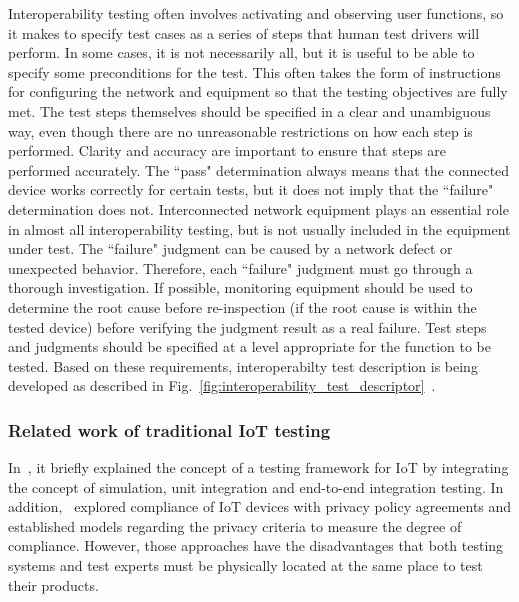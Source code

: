 Interoperability testing often involves activating and observing user functions, so it makes to specify test cases as a series of steps that human test drivers will perform. In some cases, it is not necessarily all, but it is useful to be able to specify some preconditions for the test. This often takes the form of instructions for configuring the network and equipment so that the testing objectives are fully met. The test steps themselves should be specified in a clear and unambiguous way, even though there are no unreasonable restrictions on how each step is performed. Clarity and accuracy are important to ensure that steps are performed accurately. The ``pass" determination always means that the connected device works correctly for certain tests, but it does not imply that the ``failure" determination does not. Interconnected network equipment plays an essential role in almost all interoperability testing, but is not usually included in the equipment under test. The ``failure" judgment can be caused by a network defect or unexpected behavior. Therefore, each ``failure" judgment must go through a thorough investigation. If possible, monitoring equipment should be used to determine the root cause before re-inspection (if the root cause is within the tested device) before verifying the judgment result as a real failure. Test steps and judgments should be specified at a level appropriate for the function to be tested. Based on these requirements, interoperabilty test description is being developed as described in Fig.~\ref{fig:interoperability_test_descriptor}~\cite{2018_ts_0013_interoperability}. 

\subsubsection{Related work of traditional IoT testing}
\label{sec:related_work}
\noindent
In~\cite{frameworkIoT2017}, it briefly explained the concept of a
testing framework for IoT by integrating the concept of simulation,
unit integration and end-to-end integration testing.
In addition,~\cite{ensuringCompliance2018} explored compliance
of IoT devices with privacy policy agreements and established models
regarding the privacy criteria to measure the degree of
compliance. However, those approaches have the disadvantages that both
testing systems and test experts must be physically located at the
same place to test their products.

